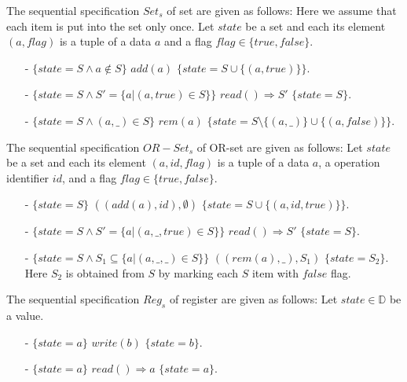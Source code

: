 \begin{example}[Set]
\label{definition:sequential specification of set}
The sequential specification $\mathit{Set}_s$ of set are given as follows: Here we assume that each item is put into the set only once. Let $state$ be a set and each its element $(a,flag)$ is a tuple of a data $a$ and a flag $flag \in \{ \mathit{true},\mathit{false} \}$. 

\begin{itemize}
\setlength{\itemsep}{0.5pt}
\item[-] $\{ state = S \wedge a \notin S \}$ $add(a)$ $\{ state = S \cup \{ (a,\mathit{true}) \} \}$.
\item[-] $\{ state = S \wedge S' = \{a \vert (a,\mathit{true}) \in S \} \}$ $read() \Rightarrow S'$ $\{ state = S \}$.
\item[-] $\{ state = S \wedge (a,\_) \in S \}$ $rem(a)$ $\{ state = S \setminus \{ (a,\_) \} \cup \{ (a,\mathit{false}) \} \}$.
\end{itemize} 
\end{example} 



\begin{example}[OR-Set]
\label{definition:sequential specification of or-set}
The sequential specification $\mathit{OR-Set}_s$ of OR-set are given as follows: Let $state$ be a set and each its element $(a,id,flag)$ is a tuple of a data $a$, a operation identifier $id$, and a flag $flag \in \{ \mathit{true},\mathit{false} \}$.
\begin{itemize}
\setlength{\itemsep}{0.5pt}
\item[-] $\{ state = S  \}$ $((add(a),\mathit{id}),\emptyset)$ $\{ state = S \cup \{ (a,\mathit{id},\mathit{true}) \} \}$.
\item[-] $\{ state = S \wedge S' = \{ a \vert (a,\_,\mathit{true}) \in S \} \}$ $read() \Rightarrow S'$ $\{ state = S \}$. 
\item[-] $\{ state = S  \wedge S_1 \subseteq \{a \vert (a,\_,\_) \in S\} \}$ $((rem(a),\_),S_1)$ $\{ state = S_2  \}$. Here $S_2$ is obtained from $S$ by marking each $S$ item with $\mathit{false}$ flag. 
\end{itemize}
\end{example} 


\begin{example}[Register]
\label{definition:sequential specification of register}
The sequential specification $\mathit{Reg}_s$ of register are given as follows: Let $state \in \mathbb{D}$ be a value.
\begin{itemize}
\setlength{\itemsep}{0.5pt}
\item[-] $\{ state = a  \}$ $write(b)$ $\{ state = b \}$.
\item[-] $\{ state = a \}$ $read() \Rightarrow a$ $\{ state = a \}$. 
\end{itemize}
\end{example}


